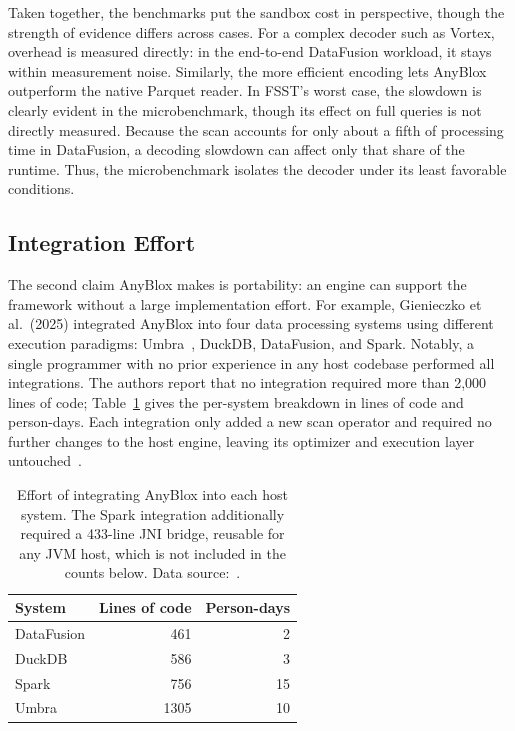 Taken together, the benchmarks put the sandbox cost in perspective, though the strength of evidence differs across cases. For a complex decoder such as Vortex, overhead is measured directly: in the end-to-end DataFusion workload, it stays within measurement noise. Similarly, the more efficient encoding lets AnyBlox outperform the native Parquet reader. In FSST's worst case, the slowdown is clearly evident in the microbenchmark, though its effect on full queries is not directly measured. Because the scan accounts for only about a fifth of processing time in DataFusion, a decoding slowdown can affect only that share of the runtime. Thus, the microbenchmark isolates the decoder under its least favorable conditions.

\subsection{Integration Effort}

The second claim AnyBlox makes is portability: an engine can support the framework without a large implementation effort. For example, Gienieczko et al.\ (2025) integrated AnyBlox into four data processing systems using different execution paradigms: Umbra~\cite{neumannUmbraDiskBasedSystem}, DuckDB, DataFusion, and Spark. Notably, a single programmer with no prior experience in any host codebase performed all integrations. The authors report that no integration required more than 2,000 lines of code; Table~\ref{tab:integration} gives the per-system breakdown in lines of code and person-days. Each integration only added a new scan operator and required no further changes to the host engine, leaving its optimizer and execution layer untouched~\cite{gienieczkoAnyBloxFrameworkSelfDecoding2025}.

\begin{table}
    \centering
    \caption{Effort of integrating AnyBlox into each host system. The Spark integration additionally required a 433-line JNI bridge, reusable for any JVM host, which is not included in the counts below. Data source:~\cite{gienieczkoAnyBloxFrameworkSelfDecoding2025}.}
    \label{tab:integration}
    \begin{tabular}{lrr}
        \toprule
        System     & Lines of code & Person-days \\
        \midrule
        DataFusion & 461           & 2           \\
        DuckDB     & 586           & 3           \\
        Spark      & 756           & 15          \\
        Umbra      & 1305          & 10          \\
        \bottomrule
    \end{tabular}
\end{table}

